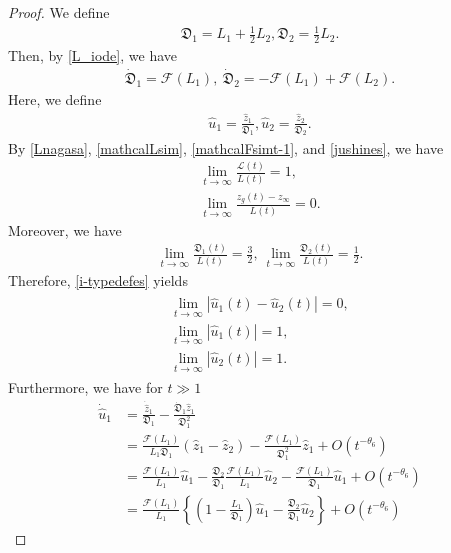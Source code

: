 \documentclass[10pt,a4paper]{amsart}
\numberwithin{equation}{section}
\begin{document}
\begin{proof}
We define 
\begin{align*}
\mathfrak{D}_1=L_1+\frac{1}{2}L_2, \mathfrak{D}_2=\frac{1}{2}L_2.
\end{align*}
Then, by \eqref{L_iode}, we have
\begin{align*}
\dot{\mathfrak{D}}_1=\mathcal{F}(L_1),\ \dot{\mathfrak{D}}_2=-\mathcal{F}(L_1)+\mathcal{F}(L_2).
\end{align*}
Here, we define
\begin{align*}
\hat{u}_1=\frac{\hat{z}_1}{\mathfrak{D}_1}, \hat{u}_2=\frac{\hat{z}_2}{\mathfrak{D}_2}.
\end{align*}
By \eqref{Lnagasa}, \eqref{mathcalLsim}, \eqref{mathcalFsimt-1}, and \eqref{jushines}, we have
\begin{align*}
\lim_{t\to\infty}\frac{\mathcal{L}(t)}{L(t)}=1,
\\
\lim_{t\to\infty}\frac{z_g(t)-z_{\infty}}{L(t)}=0.
\end{align*}
Moreover, we have
\begin{align*}
\lim_{t\to\infty}\frac{\mathfrak{D}_1(t)}{L(t)}=\frac{3}{2},\ \lim_{t\to\infty}\frac{\mathfrak{D}_2(t)}{L(t)}=\frac{1}{2}.
\end{align*}
Therefore, \eqref{i-typedefes} yields
\begin{align}\label{hatusalim}
\begin{aligned}
\lim_{t\to\infty}\left|\hat{u}_1(t)-\hat{u}_2(t)\right|=0,
\\
\lim_{t\to\infty}\left|\hat{u}_1(t)\right|=1,
\\
\lim_{t\to\infty}\left|\hat{u}_2(t)\right|=1.
\end{aligned}
\end{align}
Furthermore, we have for $t\gg 1$
\begin{align*}
\dot{\hat{u}}_1&=\frac{\dot{\hat{z}}_1}{\mathfrak{D}_1}-\frac{\dot{\mathfrak{D}}_1\hat{z}_1}{\mathfrak{D}_1^2}
\\
&=\frac{\mathcal{F}(L_1)}{L_1\mathfrak{D}_1}\left(\hat{z}_1-\hat{z}_2\right)-\frac{\mathcal{F}(L_1)}{\mathfrak{D}_1^2}\hat{z}_1+O\left(t^{-\theta_6}\right)
\\
&=\frac{\mathcal{F}(L_1)}{L_1}\hat{u}_1-\frac{\mathfrak{D}_2}{\mathfrak{D}_1}\frac{\mathcal{F}(L_1)}{L_1}\hat{u}_2-\frac{\mathcal{F}(L_1)}{\mathfrak{D}_1}\hat{u}_1+O\left(t^{-\theta_6}\right)
\\
&=\frac{\mathcal{F}(L_1)}{L_1}\left\{\left(1-\frac{L_1}{\mathfrak{D}_1}\right)\hat{u}_1-\frac{\mathfrak{D}_2}{\mathfrak{D}_1}\hat{u}_2\right\}+O\left(t^{-\theta_6}\right)

\end{align*}
\end{proof}
\end{document}
